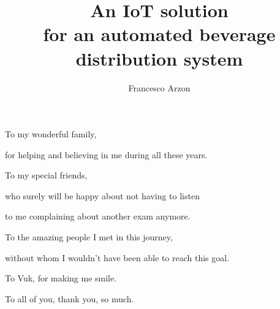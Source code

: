 \documentclass[target=bach,aauheader=,style=]{thud}
\title{An IoT solution \\for an automated beverage \\distribution system}
\author{Francesco Arzon}
\begin{document}
\maketitle

\begin{dedication}

To my wonderful family,\par for helping and believing in me during all these years.\\
\hfill

To my special friends,\par who surely will be happy about not having to listen \par to me complaining about another exam anymore.\\
\hfill

To the amazing people I met in this journey,\par without whom I wouldn't have been able to reach this goal.\\
\hfill

To Vuk, for making me smile.\\
\hfill

To all of you, thank you, so much.

\end{dedication}


\tableofcontents



\listoffigures

\mainmatter


\end{document}
